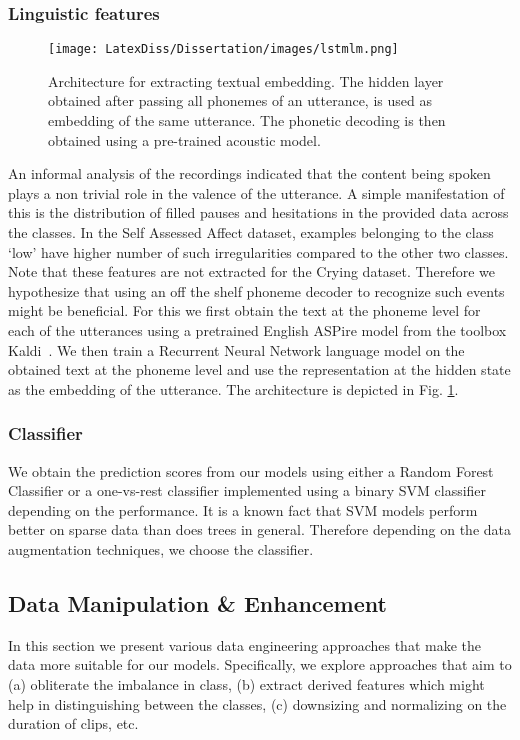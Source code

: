 \subsubsection{Linguistic features}

\begin{figure}[t]
  \centering
  \texttt{[image: LatexDiss/Dissertation/images/lstmlm.png]}
  \caption{Architecture for extracting textual embedding. The hidden layer obtained after passing all phonemes of an utterance, is used as embedding of the same utterance. The phonetic decoding is then obtained using a pre-trained acoustic model.}
  \label{lstmlm}
\end{figure}

An informal analysis of the recordings indicated that the content being spoken plays a non trivial role in the valence of the utterance. A simple manifestation of this is the distribution of filled pauses and hesitations in the provided data across the classes. In the Self Assessed  Affect dataset, examples belonging to the class `low' have higher number of such irregularities compared to the other two classes. Note that these features are not extracted for the Crying dataset. Therefore we hypothesize that using an off the shelf phoneme decoder to recognize such events might be beneficial. For this we first obtain the text at the phoneme level for each of the utterances using a pretrained English ASPire model from the toolbox Kaldi~\cite{kaldi2011}. We then train a Recurrent Neural Network language model on the obtained text at the phoneme level and use the representation at the hidden state as the embedding of the utterance. The architecture is depicted in Fig. \ref{lstmlm}.  

\subsubsection{Classifier}
We obtain the prediction scores from our models using either a Random Forest Classifier or a one-vs-rest classifier implemented using a binary SVM classifier depending on the performance. It is a known fact that SVM models perform better on sparse data than does trees in general. Therefore depending on the data augmentation techniques, we choose the classifier. 

\subsection{Data Manipulation \& Enhancement}
In this section we present various data engineering approaches that make the data more suitable for our models. Specifically, we explore approaches that aim to (a) obliterate the imbalance in class, (b) extract derived features which might help in distinguishing between the classes, (c) downsizing and normalizing on the duration of clips, etc. 

